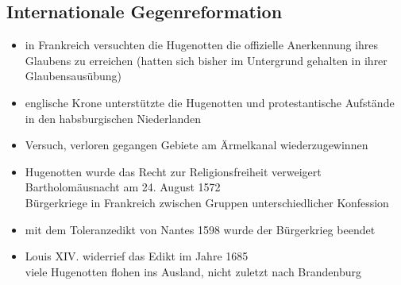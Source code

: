 \documentclass[11pt,a4paper]{article}
\begin{document}
\subsection*{\textsf{Internationale Gegenreformation}}


\begin{itemize}
\item in Frankreich versuchten die Hugenotten die offizielle Anerkennung ihres Glaubens zu erreichen (hatten sich bisher im Untergrund gehalten in ihrer Glaubensausübung)
\item englische Krone unterstützte die Hugenotten und protestantische Aufstände in den habsburgischen Niederlanden
\item Versuch, verloren gegangen Gebiete am Ärmelkanal wiederzugewinnen
\item Hugenotten wurde das Recht zur Religionsfreiheit verweigert\\
 Bartholomäusnacht am 24. August 1572\\
 Bürgerkriege in Frankreich zwischen Gruppen unterschiedlicher Konfession\\
\item mit dem Toleranzedikt von Nantes 1598 wurde der Bürgerkrieg beendet
\item Louis XIV. widerrief das Edikt im Jahre 1685\\
 viele Hugenotten flohen ins Ausland, nicht zuletzt nach Brandenburg
\end{itemize}
\end{document}
